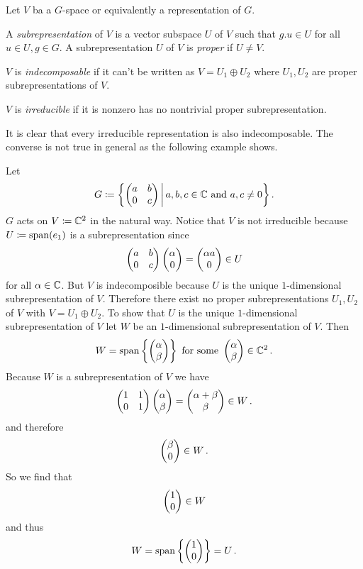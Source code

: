 \begin{defi}
    Let $V$ ba a $G$-space or equivalently a representation of $G$.

    A \emph{subrepresentation} of $V$ is a vector subspace $U$ of $V$ such that $g.u \in U$ for all $u \in U, g \in G$.
    A subrepresentation $U$ of $V$ is \emph{proper} if $U \neq V$.
    
    $V$ is \emph{indecomposable} if it can’t be written as $V = U_1 \oplus U_2$ where $U_1, U_2$ are proper subrepresentations of $V$.
    
    $V$ is \emph{irreducible} if it is nonzero has no nontrivial proper subrepresentation.
\end{defi}

It is clear that every irreducible representation is also indecomposable.
The converse is not true in general as the following example shows.

\begin{expl}
  Let
  \[
              G
    \coloneqq \left\{
                \begin{pmatrix}
                  a & b \\
                  0 & c
                \end{pmatrix}
              \,\middle|\,
                a, b, c \in \mathbb{C}
                \text{ and }
                a, c \neq 0
              \right\} .
  \]
  $G$ acts on $V \coloneqq \mathbb{C}^2$ in the natural way.
  Notice that $V$ is not irreducible because $U \coloneqq \operatorname{span}(e_1)$ is a subrepresentation since
  \[
        \begin{pmatrix}
          a & b \\
          0 & c 
        \end{pmatrix}
        \begin{pmatrix}\alpha \\ 0\end{pmatrix}
    =   \begin{pmatrix}\alpha a \\ 0\end{pmatrix}
    \in U
  \]
  for all $\alpha \in \mathbb{C}$.
  But $V$ is indecomposible because $U$ is the unique $1$-dimensional subrepresentation of $V$.
  Therefore there exist no proper subrepresentations $U_1, U_2$ of $V$ with $V = U_1 \oplus U_2$.
  To show that $U$ is the unique $1$-dimensional subrepresentation of $V$ let $W$ be an $1$-dimensional subrepresentation of $V$.
  Then
  \[
      W
    = \operatorname{span}\left\{
              \begin{pmatrix}\alpha \\ \beta\end{pmatrix}
            \right\}
    \text{ for some }
        \begin{pmatrix}\alpha \\ \beta\end{pmatrix}
    \in \mathbb{C}^2 \,.
  \]
  Because $W$ is a subrepresentation of $V$ we have
  \[
        \begin{pmatrix}
          1 & 1 \\
          0 & 1
        \end{pmatrix}
        \begin{pmatrix}\alpha \\ \beta\end{pmatrix}
    =   \begin{pmatrix}\alpha + \beta \\ \beta\end{pmatrix}
    \in W \,.
  \]
  and therefore
  \[
    \begin{pmatrix}\beta \\ 0\end{pmatrix} \in W \,.
  \]
  So we find that
  \[
    \begin{pmatrix}1 \\ 0\end{pmatrix} \in W
  \]
  and thus
  \[
      W
    = \operatorname{span} \left\{ \begin{pmatrix}1 \\ 0\end{pmatrix} \right\}
    = U \,.
  \]
\end{expl}


